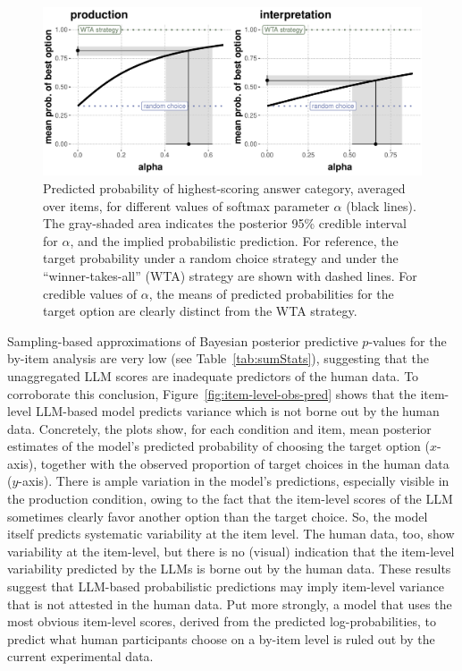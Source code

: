\documentclass[fleqn]{article}
\begin{document}
\begin{figure}[t]
  \centering
  \includegraphics[width=\textwidth]{00-pics/GPT-closeness-target-by-alpha-item-level.pdf}
  \caption{
    Predicted probability of highest-scoring answer category, averaged over items, for different values of softmax parameter $\alpha$ (black lines).
    The gray-shaded area indicates the posterior 95\% credible interval for $\alpha$, and the implied probabilistic prediction.
    For reference, the target probability under a random choice strategy and under the ``winner-takes-all'' (WTA) strategy are shown with dashed lines.
    For credible values of $\alpha$, the means of predicted probabilities for the target option are clearly distinct from the WTA strategy.
  }
  \label{fig:closeness-target-item-level}
\end{figure}

Sampling-based approximations of Bayesian posterior predictive $p$-values for the by-item analysis are very low (see Table~\ref{tab:sumStats}), suggesting that the unaggregated LLM scores are inadequate predictors of the human data.
To corroborate this conclusion, Figure~\ref{fig:item-level-obs-pred} shows that the item-level LLM-based model predicts variance which is not borne out by the human data.
Concretely, the plots show, for each condition and item, mean posterior estimates of the model's predicted probability of choosing the target option ($x$-axis), together with the observed proportion of target choices in the human data ($y$-axis).
There is ample variation in the model's predictions, especially visible in the production condition, owing to the fact that the item-level scores of the LLM sometimes clearly favor another option than the target choice.
So, the model itself predicts systematic variability at the item level.
The human data, too, show variability at the item-level, but there is no (visual) indication that the item-level variability predicted by the LLMs is borne out by the human data.
These results suggest that LLM-based probabilistic predictions may imply item-level variance that is not attested in the human data.
Put more strongly, a model that uses the most obvious item-level scores, derived from the predicted log-probabilities, to predict what human participants choose on a by-item level is ruled out by the current experimental data.
\end{document}
